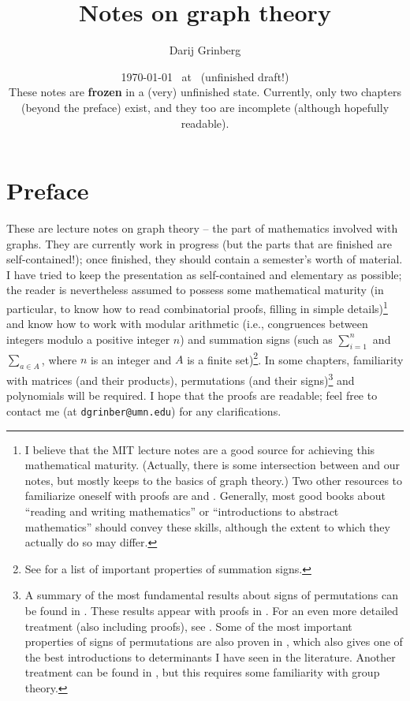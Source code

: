 \documentclass[numbers=enddot,12pt,final,onecolumn,notitlepage]{scrartcl}%
\theoremstyle{definition}
\let\sumnonlimits\sum
\renewcommand{\sum}{\sumnonlimits\limits}
\begin{document}
\title{Notes on graph theory}
\author{Darij Grinberg}
\date{
\today\ 
at \DTMcurrenttime\ 
(unfinished draft!)\\
These notes are \textbf{frozen} in a (very) unfinished state. Currently, only
two chapters (beyond the preface) exist, and they too are incomplete
(although hopefully readable).}
\maketitle
\tableofcontents

\section{Preface}

These are lecture notes on graph theory -- the part of mathematics
involved with graphs. They are currently work in
progress (but the parts that are finished are self-contained!);
once finished, they should contain a semester's worth of
material. I have tried to keep the presentation as self-contained and
elementary as possible; the reader is nevertheless assumed to possess
some mathematical maturity (in particular, to know how to read
combinatorial proofs, filling in simple details)\footnote{I believe
that the MIT lecture notes \cite{LeLeMe16} are a good source for
achieving this mathematical maturity. (Actually, there is some
intersection between \cite[Chapters 10 and 12]{LeLeMe16} and our
notes, but \cite{LeLeMe16} mostly keeps to the basics of graph
theory.)
Two other resources to familiarize oneself with proofs are
\cite{Hammac15} and \cite{Day-proofs}.
Generally, most good books about ``reading and
writing mathematics'' or ``introductions to abstract mathematics''
should convey these skills, although the extent to which they actually
do so may differ.}
and know how to work
with modular arithmetic (i.e., congruences between integers modulo a
positive integer $n$) and summation signs (such as $\sum_{i=1}^n$ and
$\sum_{a \in A}$, where $n$ is an integer and $A$ is a finite
set)\footnote{See \cite[\S 1.3]{detnotes} for a list of important
properties of summation signs.}.
In some chapters, familiarity with matrices (and their products),
permutations (and their signs)\footnote{A summary of the most
fundamental results about signs of permutations can be found in
\cite[\S 8.1]{LaNaSc16}. These results appear with proofs in
\cite[Chapter 6.B]{Day-proofs}. For an even more detailed treatment
(also including proofs),
see \cite[\S 4.1--4.3]{detnotes}. Some of the most important
properties of signs of permutations are also proven in
\cite[Appendix B]{Strick13}, which also gives one of the best
introductions to determinants I have seen in the literature.
Another treatment can be found in
\cite{Conrad-sign}, but this requires some familiarity with group
theory.}
and polynomials will be required.
I hope that the proofs are readable; feel free to contact me (at
\texttt{dgrinber@umn.edu}) for any clarifications.
\end{document}
